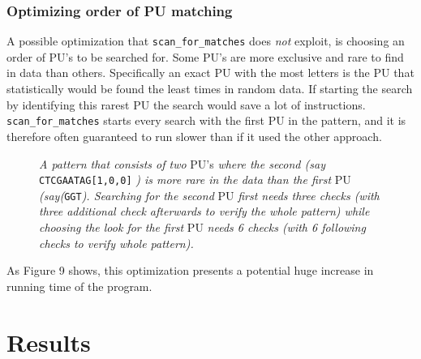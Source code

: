 \documentclass[12pt]{article}
\newcommand{\scm}{\texttt{scan\_for\_matches} }
\newcommand{\pu}{PU }
\newcommand{\pus}{PU's }
\begin{document}
\subsubsection{Optimizing order of \pu matching}
A possible optimization that \scm does \textit{not} exploit, is choosing an order of \pus to be searched for.
Some \pus are more exclusive and rare to find in data than others. Specifically an exact \pu with the most
letters is the \pu that statistically would be found the least times in random data. If starting the search by
identifying this rarest \pu the search would save a lot of instructions. \scm starts every search with the 
first \pu in the pattern, and it is therefore often guaranteed to run slower than if it used the other approach.
\begin{figure}[H]
\begin{center}
\end{center}
\caption{\textit{A pattern that consists of two} \pus \textit{where the second (say} \texttt{CTCGAATAG[1,0,0]}
\textit{) is more rare in the data than the first} \pu \textit{(say(}\texttt{GGT}\textit{). Searching for the 
second} \pu \textit{first needs three checks (with three additional check afterwards to verify the whole pattern)
while choosing the look for the first} \pu \textit{needs 6 checks (with 6 following checks to verify whole pattern).}}
\end{figure}
\noindent As Figure 9 shows, this optimization presents a potential huge increase in running time of the program. \newpage
\section{Results}

\printbibliography
\end{document}
